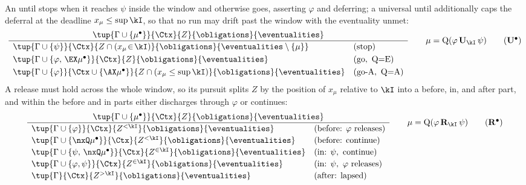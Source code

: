 An until stops when it reaches $\psi$ inside the window and otherwise goes, asserting $\varphi$ and
deferring; a universal until additionally caps the deferral at the deadline $x_\mu\le\sup\kI$, so that no
run may drift past the window with the eventuality unmet:
\[
\frac{\tup{\Gamma\cup\{\mu^\bullet\}}{\Ctx}{Z}{\obligations}{\eventualities}}
{\begin{array}{ll}
\tup{\Gamma\cup\{\psi\}}{\Ctx}{Z\cap(x_\mu\!\in\!\kI)}{\obligations}{\eventualities\setminus\{\mu\}} & (\text{stop})\\[3pt]
\tup{\Gamma\cup\{\varphi,\,\EX\mu^\bullet\}}{\Ctx}{Z}{\obligations}{\eventualities} & (\text{go},\ \mathrm{Q}{=}\mathrm{E})\\[3pt]
\tup{\Gamma\cup\{\varphi\}}{\Ctx\cup\{\AX\mu^\bullet\}}{Z\cap(x_\mu\le\sup\kI)}{\obligations}{\eventualities} & (\text{go-A},\ \mathrm{Q}{=}\mathrm{A})
\end{array}}
\qquad \mu=\mathrm{Q}(\varphi\,\mathbf{U}_\kI\,\psi)
\tag{$\mathbf{U}^\bullet$}\label{tag:Uunf}
\]
A release must hold across the whole window, so its pursuit splits $Z$ by the position of $x_\mu$ relative
to $\kI$ into a before, in, and after part, and within the before and in parts either discharges through
$\varphi$ or continues:
\[
\frac{\tup{\Gamma\cup\{\mu^\bullet\}}{\Ctx}{Z}{\obligations}{\eventualities}}
{\begin{array}{ll}
\tup{\Gamma\cup\{\varphi\}}{\Ctx}{Z^{<\kI}}{\obligations}{\eventualities} & (\text{before: }\varphi\text{ releases})\\[2pt]
\tup{\Gamma\cup\{\nxQ\mu^\bullet\}}{\Ctx}{Z^{<\kI}}{\obligations}{\eventualities} & (\text{before: continue})\\[2pt]
\tup{\Gamma\cup\{\psi,\,\nxQ\mu^\bullet\}}{\Ctx}{Z^{\in\kI}}{\obligations}{\eventualities} & (\text{in: }\psi,\text{ continue})\\[2pt]
\tup{\Gamma\cup\{\varphi,\psi\}}{\Ctx}{Z^{\in\kI}}{\obligations}{\eventualities} & (\text{in: }\psi,\ \varphi\text{ releases})\\[2pt]
\tup{\Gamma}{\Ctx}{Z^{>\kI}}{\obligations}{\eventualities} & (\text{after: lapsed})
\end{array}}
\qquad \mu=\mathrm{Q}(\varphi\,\mathbf{R}_\kI\,\psi)
\tag{$\mathbf{R}^\bullet$}\label{tag:Runf}
\]

